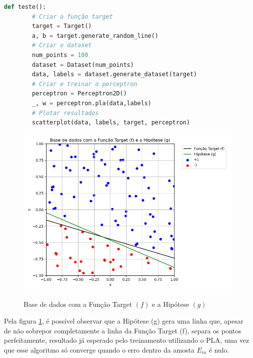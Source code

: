 \begin{lstlisting}[language=Python, caption=Teste das classes, label=cod:perceptron_test]
    def teste():
        # Criar a função target
        target = Target()
        a, b = target.generate_random_line()
        # Criar o dataset
        num_points = 100
        dataset = Dataset(num_points)
        data, labels = dataset.generate_dataset(target)
        # Criar e treinar o perceptron
        perceptron = Perceptron2D()
        _, w = perceptron.pla(data,labels)
        # Plotar resultados
        scatterplot(data, labels, target, perceptron)
\end{lstlisting}

\begin{figure}[H]
    \caption{Base de dados com a Função Target $(f)$ e a Hipótese $(g)$}
       \centering
       \includegraphics[width=12cm]{perceptron_plot.png}
    \label{fig:perceptron_plot}
\end{figure}

Pela figura \ref{fig:perceptron_plot}, é possível observar que a Hipótese (g) gera uma linha que, apesar de não sobrepor completamente a linha da Função Target (f), separa os pontos perfeitamente, resultado já esperado pelo treinamento utilizando o PLA, uma vez que esse algoritmo só converge quando o erro dentro da amosta $E_{in}$ é nulo.  

